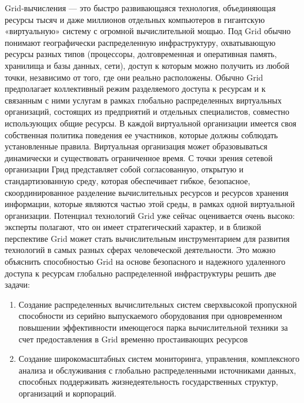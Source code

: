 \documentclass[och, referat]{SCWorks}
\author{Sharov Alex}
\begin{document}


\patitle{}
\paname{}
\term{}
\practStart{}
\practFinish{}
\MakeTitle

\setcounter{tocdepth}{1}

\tableofcontents

\intro

Grid-вычисления — это быстро развивающаяся технология, объединяющая ресурсы тысяч и даже миллионов отдельных компьютеров в гигантскую «виртуальную» систему с огромной вычислительной мощью. Под Grid обычно понимают географически распределенную инфраструктуру, охватывающую ресурсы разных типов (процессоры, долговременная и оперативная память, хранилища и базы данных, сети), доступ к которым можно получить из любой точки, независимо от того, где они реально расположены. Обычно Grid предполагает коллективный режим разделяемого доступа к ресурсам и к связанным с ними услугам в рамках глобально распределенных виртуальных организаций, состоящих из предприятий и отдельных специалистов, совместно использующих общие ресурсы. В каждой виртуальной организации имеется своя собственная политика поведения ее участников, которые должны соблюдать установленные правила. Виртуальная организация может образовываться динамически и существовать ограниченное время. С точки зрения сетевой организации Грид представляет собой согласованную, открытую и стандартизованную среду, которая обеспечивает гибкое, безопасное, скоординированное разделение вычислительных ресурсов и ресурсов хранения информации, которые являются частью этой среды, в рамках одной виртуальной организации. Потенциал технологий Grid уже сейчас оценивается очень высоко: эксперты полагают, что он имеет стратегический характер, и в близкой перспективе Grid может стать вычислительным инструментарием для развития технологий в самых разных сферах человеческой деятельности. Это можно объяснить способностью Grid на основе безопасного и надежного удаленного доступа к ресурсам глобально распределенной инфраструктуры решить две задачи:
\begin{enumerate} 
\item Создание распределенных вычислительных систем сверхвысокой пропускной способности из серийно выпускаемого оборудования при одновременном повышении эффективности имеющегося парка вычислительной техники за счет предоставления в Grid временно простаивающих ресурсов
\item Создание широкомасштабных систем мониторинга, управления, комплексного анализа и обслуживания с глобально распределенными источниками данных, способных поддерживать жизнедеятельность государственных структур, организаций и корпораций.
\end{enumerate}
\end{document}
